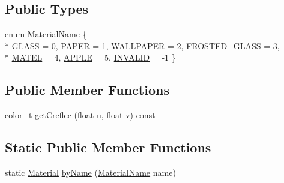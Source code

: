 \subsection*{Public Types}
\begin{DoxyCompactItemize}
\item 
enum \hyperlink{structMaterial_afca902ab9d34ae538cf8eb74afe51911}{Material\+Name} \{ \\*
\hyperlink{structMaterial_afca902ab9d34ae538cf8eb74afe51911aafad09ef73f6aaa26e1dc8bee89871f4}{G\+L\+A\+SS} = 0, 
\hyperlink{structMaterial_afca902ab9d34ae538cf8eb74afe51911aa2ff05704fdd8947102f11cc6b900524}{P\+A\+P\+ER} = 1, 
\hyperlink{structMaterial_afca902ab9d34ae538cf8eb74afe51911adf626c4a22b6e4ebaf71c865f3745511}{W\+A\+L\+L\+P\+A\+P\+ER} = 2, 
\hyperlink{structMaterial_afca902ab9d34ae538cf8eb74afe51911a2589b47b8d5b8e31f37f5cfa05eba139}{F\+R\+O\+S\+T\+E\+D\+\_\+\+G\+L\+A\+SS} = 3, 
\\*
\hyperlink{structMaterial_afca902ab9d34ae538cf8eb74afe51911aa6a166ca282ccb460f6d6f15ba84330c}{M\+A\+T\+EL} = 4, 
\hyperlink{structMaterial_afca902ab9d34ae538cf8eb74afe51911a959db05170007afe03fa97ea2da588a6}{A\+P\+P\+LE} = 5, 
\hyperlink{structMaterial_afca902ab9d34ae538cf8eb74afe51911ac7607d77ae775a5b04874bda2cb82a2e}{I\+N\+V\+A\+L\+ID} = -\/1
 \}
\end{DoxyCompactItemize}
\subsection*{Public Member Functions}
\begin{DoxyCompactItemize}
\item 
\hyperlink{ray_8h_a8a2580fb65f7d3d4e24bdd412b9bd92d}{color\+\_\+t} \hyperlink{structMaterial_a4ab05a2f4f22025aee4c5087a3517d48}{get\+Creflec} (float u, float v) const 
\end{DoxyCompactItemize}
\subsection*{Static Public Member Functions}
\begin{DoxyCompactItemize}
\item 
static \hyperlink{structMaterial}{Material} \hyperlink{structMaterial_ad488bda0cf014154f97bce06b1c3be29}{by\+Name} (\hyperlink{structMaterial_afca902ab9d34ae538cf8eb74afe51911}{Material\+Name} name)
\end{DoxyCompactItemize}
